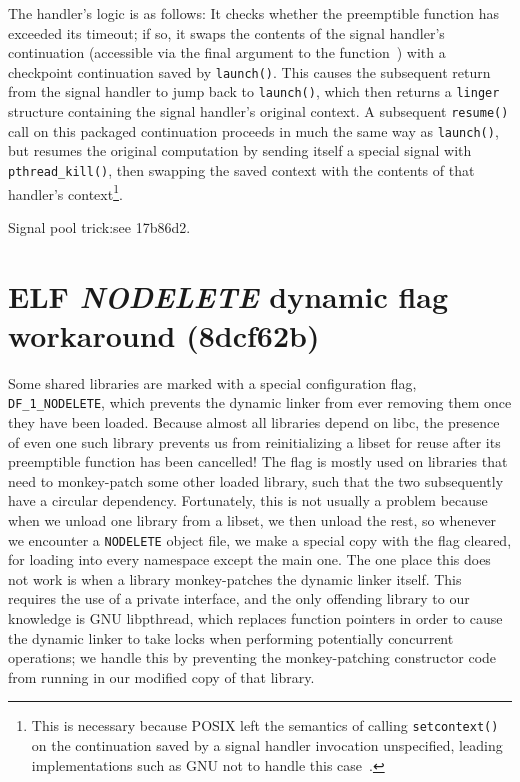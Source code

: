 \documentclass[12pt,letterpaper]{book}
\begin{document}
The handler's logic is as follows:  It checks whether
the preemptible function has exceeded its timeout; if so, it swaps the contents
of the signal handler's continuation (accessible via the final argument to the
function~\cite{sigaction-manpage}) with a checkpoint continuation saved by
\texttt{launch()}.  This causes the subsequent return from the signal handler
to jump back to \texttt{launch()}, which then returns a \texttt{linger}
structure containing the signal handler's original context.  A subsequent
\texttt{resume()} call on this packaged continuation proceeds in much the same
way as \texttt{launch()}, but resumes the original computation by sending
itself a special signal with \texttt{pthread\_kill()}, then swapping the saved
context with the contents of that handler's context\footnote{This is necessary
because POSIX left the semantics of calling \texttt{setcontext()} on the
continuation saved by a signal handler invocation unspecified, leading
implementations such as GNU not to handle this
case~\cite{getcontext-manpage}.}.

Signal pool trick:\@ see 17b86d2.


\section{ELF \textit{NODELETE} dynamic flag workaround (8dcf62b)}

Some shared libraries are marked with a special configuration flag,
\texttt{DF\_1\_NODELETE}, which prevents the dynamic linker from ever removing them
once they have been loaded.  Because almost all libraries depend on libc, the
presence of even one such library prevents us from reinitializing a libset for reuse
after its preemptible function has been cancelled!  The flag is mostly used on
libraries that need
to monkey-patch some other loaded library, such that the two subsequently have a
circular dependency.  Fortunately, this is not usually a problem because when we
unload one library from a libset, we then unload the rest, so whenever we encounter a
\texttt{NODELETE} object file, we make a special copy with the flag cleared, for
loading into every namespace except the main one.  The one place this does not work
is when a library monkey-patches the dynamic linker itself.  This
requires the use of a private interface, and the only offending library to our
knowledge is GNU libpthread, which replaces function pointers in order to cause the
dynamic linker to take locks when performing potentially concurrent operations; we
handle this by preventing the monkey-patching constructor code from running in our
modified copy of that library.
\end{document}
